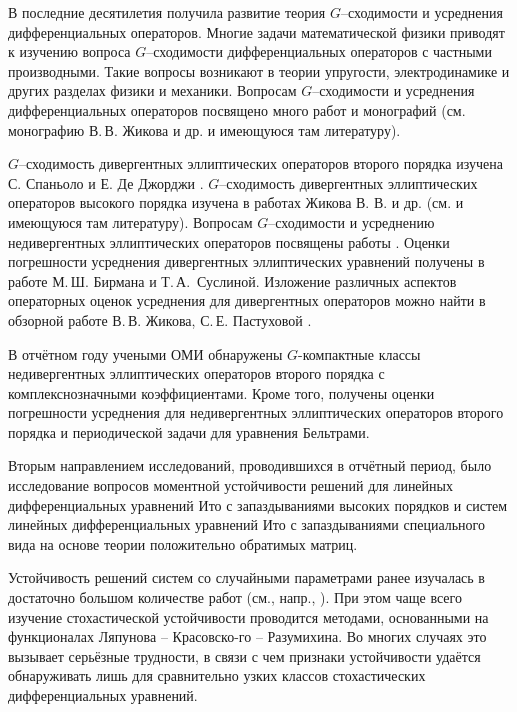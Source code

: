\Introduction




В последние десятилетия получила развитие теория $G$--сходимости и усреднения дифференциальных
операторов. Многие задачи математической
физики приводят к изучению вопроса $G$--сходимости дифференциальных
операторов с частными производными. Такие вопросы возникают в теории упругости,
электродинамике и других разделах физики и механики. Вопросам
$G$--сходимости и усреднения дифференциальных
операторов посвящено много работ и монографий (см. монографию В.\,В. Жикова и др.
\cite{smm_ZhKO} и имеющуюся там литературу).

$G$--сходимость дивергентных эллиптических операторов второго порядка изучена
С. Спаньоло и Е. Де Джорджи \cite{smm_Dg1, smm_Dg2, smm_Dg3}.
$G$--сходимость дивергентных эллиптических операторов высокого порядка изучена в
работах Жикова В. В. и др. (см. \cite{smm_ZhKO} и имеющуюся там литературу).
Вопросам $G$--сходимости и усреднению недивергентных эллиптических операторов
посвящены работы \cite{smm_ZhS, smm_ZhS1, smm_Sir1,smm_Sir}.
Оценки погрешности усреднения  дивергентных эллиптических уравнений  получены в работе  \cite{smm_Sus} М.\,Ш. Бирмана и
  Т.\,А.~Суслиной.
Изложение различных аспектов операторных оценок усреднения для дивергентных
операторов можно найти в обзорной работе В.\,В. Жикова,
С.\,Е. Пастуховой  \cite{smm_VP}.

В отчётном году учеными ОМИ обнаружены $G$-компактные классы недивергентных эллиптических операторов второго порядка с комплекснозначными коэффициентами.
Кроме того, получены оценки погрешности усреднения для недивергентных
эллиптических операторов второго порядка и периодической задачи для уравнения Бельтрами.



Вторым направлением исследований, проводившихся в отчётный период, было исследование вопросов моментной устойчивости решений для линейных дифференциальных уравнений Ито с запаздываниями высоких порядков и систем линейных дифференциальных уравнений Ито с запаздываниями специального вида на основе теории положительно обратимых матриц.

Устойчивость решений систем со случайными параметрами ранее изучалась в достаточно большом количестве работ (см., напр., \cite{kri-bib-1, kri-bib-2, kri-bib-3, kri-bib-4}). При этом чаще всего изучение стохастической устойчивости проводится методами, основанными на функционалах Ляпунова -- Красовско-\linebreak го -- Разумихина.
Во многих случаях это вызывает серьёзные трудности, в связи с чем признаки устойчивости удаётся обнаруживать лишь для сравнительно узких классов стохастических дифференциальных уравнений.

